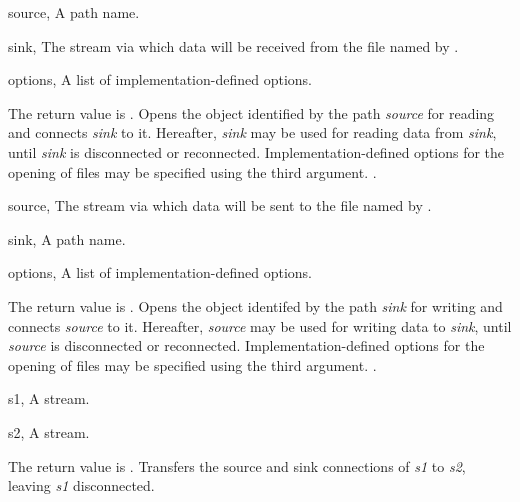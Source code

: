\begin{optDefinition}
\begin{specargs}
    \item[source, \theclass{path}] A path name.
    \item[sink, \classref{file-stream}] The stream via which data will be
    received from the file named by .
    \item[options, \classref{list}] A list of implementation-defined options.
\end{specargs}
%
\result%
The return value is \nil{}.
%
\remarks%
Opens the object identified by the path {\em source\/} for reading and
connects {\em sink\/} to it. Hereafter, {\em sink\/} may be used for reading
data from {\em sink\/}, until {\em sink\/} is disconnected or
reconnected. Implementation-defined options for the opening of files may be
specified using the third argument.
%
\seealso%
.

\begin{specargs}
    \item[source, \classref{file-stream}] The stream via which data will be sent
    to the file named by .
    \item[sink, \theclass{path}] A path name.
    \item[options, \classref{list}] A list of implementation-defined options.
\end{specargs}
%
\result%
The return value is \nil{}.
%
\remarks%
Opens the object identifed by the path {\em sink\/} for writing and
connects {\em source\/} to it. Hereafter, {\em source\/} may be used for writing
data to {\em sink}, until {\em source\/} is disconnected or
reconnected. Implementation-defined options for the opening of files may be
specified using the third argument.
%
\seealso%
.

\begin{genericargs}
    \item[s1, \classref{stream}] A stream.
    \item[s2, \classref{stream}] A stream.
\end{genericargs}
%
\result%
The return value is \nil{}.
%
\remarks%
Transfers the source and sink connections of {\em s1\/} to {\em s2},
leaving {\em s1\/} disconnected.


\end{optDefinition}
